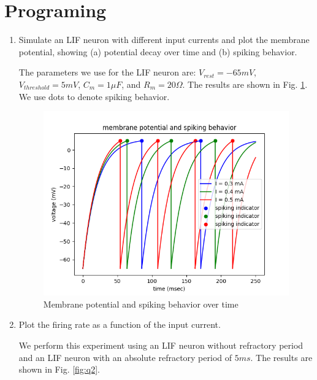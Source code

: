 \documentclass[11pt]{article}
\begin{document}
	\section*{Programing}
	\begin{enumerate}
		\item Simulate an LIF neuron with different input currents and plot the membrane potential, showing (a) potential decay over time and (b) spiking behavior.

		The parameters we use for the LIF neuron are: $V_{rest} = -65 mV$, $V_{threshold} = 5 mV$, $C_m = 1 \mu F$, and $R_m = 20 \Omega$. The results are shown in Fig. \ref{fig:q1-voltage}. We use dots to denote spiking behavior.
		
		\begin{figure}[htb]
			\centering
			\label{fig:q1-voltage}
			\includegraphics[width=.5\textwidth]{plot_programming_1.png}
			\caption{Membrane potential and spiking behavior over time}
		\end{figure}
		
		\item Plot the firing rate as a function of the input current.
		
		We perform this experiment using an LIF neuron without refractory period and an LIF neuron with an absolute refractory period of $5 ms$.
		The results are shown in Fig. \ref{fig:q2}.
		

\end{enumerate}
\end{document}
